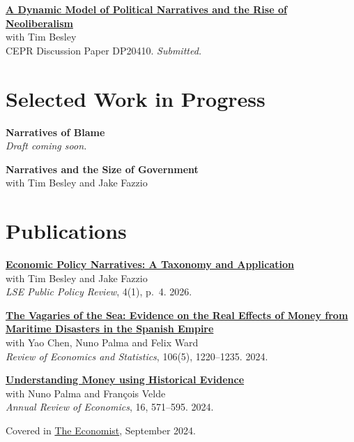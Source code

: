 \documentclass[10pt,a4paper]{article}
\newcommand{\papernote}[1]{\hspace*{1.6em}#1\par}
\newcommand{\papergap}{\par\addvspace{8pt}}
\newenvironment{paperbox}{\par\noindent\begin{minipage}{\textwidth}}{\end{minipage}\par}
\begin{document}
\begin{paperbox}
\textbf{\href{https://cepr.org/publications/dp20410}{A Dynamic Model of Political Narratives and the Rise of Neoliberalism}}\\
with Tim Besley\\
CEPR Discussion Paper DP20410. \textit{Submitted.}
\end{paperbox}

\section{Selected Work in Progress}

\begin{paperbox}
\textbf{Narratives of Blame}\\
\textit{Draft coming soon.}
\end{paperbox}
\papergap

\begin{paperbox}
\textbf{Narratives and the Size of Government}\\
with Tim Besley and Jake Fazzio
\end{paperbox}

\section{Publications}

\begin{paperbox}
\textbf{\href{https://ppr.lse.ac.uk/articles/10.31389/lseppr.147}{Economic Policy Narratives: A Taxonomy and Application}}\\
with Tim Besley and Jake Fazzio\\
\textit{LSE Public Policy Review}, 4(1), p.~4. 2026.
\end{paperbox}
\papergap

\begin{paperbox}
\textbf{\href{https://direct.mit.edu/rest/article/doi/10.1162/rest_a_01223/112437/}{The Vagaries of the Sea: Evidence on the Real Effects of Money from Maritime Disasters in the Spanish Empire}}\\
with Yao Chen, Nuno Palma and Felix Ward\\
\textit{Review of Economics and Statistics}, 106(5), 1220--1235. 2024.
\end{paperbox}
\papergap

\begin{paperbox}
\textbf{\href{https://www.annualreviews.org/content/journals/10.1146/annurev-economics-091923-040328}{Understanding Money using Historical Evidence}}\\
with Nuno Palma and Fran\c{c}ois Velde\\
\textit{Annual Review of Economics}, 16, 571--595. 2024.\par
\papernote{Covered in \href{https://www.economist.com/finance-and-economics/2024/09/19/what-the-history-of-money-tells-you-about-cryptos-future}{The Economist}, September 2024.}
\end{paperbox}
\papergap
\end{document}
